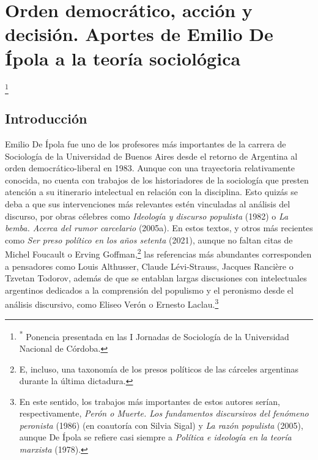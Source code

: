 \chapter{Orden democrático, acción y decisión. Aportes de Emilio De Ípola a la teoría sociológica}

\footnote{\textsuperscript{*} Ponencia presentada en las I Jornadas de Sociología de la Universidad Nacional de Córdoba.}

\section{Introducción}

Emilio De Ípola fue uno de los profesores más importantes de la carrera de Sociología de la Universidad de Buenos Aires desde el retorno de Argentina al orden democrático-liberal en 1983. Aunque con una trayectoria relativamente conocida, no cuenta con trabajos de los historiadores de la sociología que presten atención a su itinerario intelectual en relación con la disciplina. Esto quizás se deba a que sus intervenciones más relevantes estén vinculadas al análisis del discurso, por obras célebres como \emph{Ideología y discurso populista} (1982) o \emph{La bemba. Acerca del rumor carcelario} (2005a). En estos textos, y otros más recientes como \emph{Ser preso político en los años setenta} (2021), aunque no faltan citas de Michel Foucault o Erving Goffman,\footnote{E, incluso, una taxonomía de los presos políticos de las cárceles argentinas durante la última dictadura.} las referencias más abundantes corresponden a pensadores como Louis Althusser, Claude Lévi-Strauss, Jacques Rancière o Tzvetan Todorov, además de que se entablan largas discusiones con intelectuales argentinos dedicados a la comprensión del populismo y el peronismo desde el análisis discursivo, como Eliseo Verón o Ernesto Laclau.\footnote{En este sentido, los trabajos más importantes de estos autores serían, respectivamente, \emph{Perón o Muerte. Los fundamentos discursivos del fenómeno peronista} (1986) (en coautoría con Silvia Sigal) y \emph{La razón populista} (2005), aunque De Ípola se refiere casi siempre a \emph{Política e ideología en la teoría marxista} (1978).}

